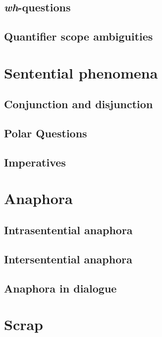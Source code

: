 \subsection{\textit{wh}-questions}

\subsection{Quantifier scope ambiguities}

\section{Sentential phenomena}

\subsection{Conjunction and disjunction}

\subsection{Polar Questions}

\subsection{Imperatives}

\section{Anaphora}

\subsection{Intrasentential anaphora}

\subsection{Intersentential anaphora}

\subsection{Anaphora in dialogue}

\section*{Scrap}

